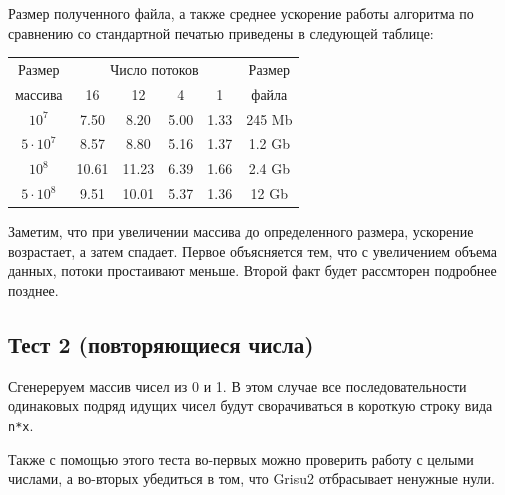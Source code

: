 \documentclass[specialist,subf,href,colorlinks=true,14pt
,times,mtpro,specialist
]{disser}
\begin{document}
Размер полученного файла, а также среднее ускорение работы алгоритма по сравнению со стандартной печатью приведены в следующей таблице:
\begin{center}
\begin{tabular}{||c|c|c|c|c|c||}
\hline
\hline
Размер & \multicolumn{4}{c|}{Число потоков} & Размер\\
\hhline{~|-|-|-|-|~|}
массива & 16 & 12 & 4 & 1 & файла \\
\hline
$10^7$ & 7.50 & 8.20 & 5.00 & 1.33 & 245 Mb \\
\hline
$5 \cdot 10^7$ & 8.57 & 8.80 & 5.16 & 1.37 & 1.2 Gb \\
\hline
$10^8$ & 10.61 & 11.23 & 6.39 & 1.66 & 2.4 Gb\\
\hline
$5 \cdot 10^8$ & 9.51 & 10.01 & 5.37 & 1.36 & 12 Gb \\
\hline
\hline
\end{tabular}
\end{center}

Заметим, что при увеличении массива до определенного размера, ускорение возрастает, а затем спадает.
Первое объясняется тем, что с увеличением объема данных, потоки простаивают меньше.
Второй факт будет рассмторен подробнее позднее.

\subsection{Тест 2 (повторяющиеся числа)}
Сгенереруем массив чисел из 0 и 1.
В этом случае все последовательности одинаковых подряд идущих чисел будут сворачиваться в короткую строку вида \texttt{n*x}.

Также с помощью этого теста во-первых можно проверить работу с целыми числами, а во-вторых убедиться в том, что \textsf{Grisu2} отбрасывает ненужные нули.
\end{document}
